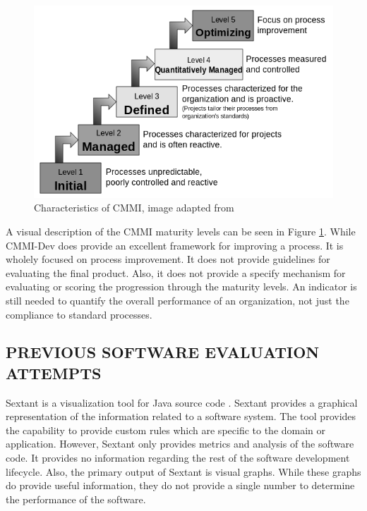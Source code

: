 \documentclass[SDSUThesis.tex]{subfiles}
\begin{document}
        
        \begin{figure}[here]
            \centering
            \includegraphics[scale=.7]{images/cmmi.png}
            \caption[Characteristics of CMMI]{Characteristics of CMMI, image adapted from  \cite{Godfrey} }
            \label{fig:cmmi}
        \end{figure}

A visual description of the CMMI maturity levels can be seen in Figure \ref{fig:cmmi}.  
While CMMI-Dev does provide an excellent framework for improving a process.  It
is wholely focused on process improvement.  It does not provide guidelines
for evaluating the final product.  
Also, it does not provide a specify mechanism for evaluating
or scoring the progression through the maturity levels.  
An indicator is still needed to quantify the overall performance of an organization, not
just the compliance to standard processes.  


\subsection{PREVIOUS SOFTWARE EVALUATION ATTEMPTS }

Sextant is a visualization tool for Java source code \cite{Winter2013}.  Sextant provides a graphical representation of the information related 
to a software system.  The tool provides the capability to provide custom rules which are specific to the domain or application.  However,
Sextant only provides metrics and analysis of the software code.  It provides no information regarding the rest of the 
software development lifecycle.  Also, the primary output of Sextant is visual graphs.  While these graphs do provide
useful information, they do not provide a single number to determine the performance of the software.
\end{document}
